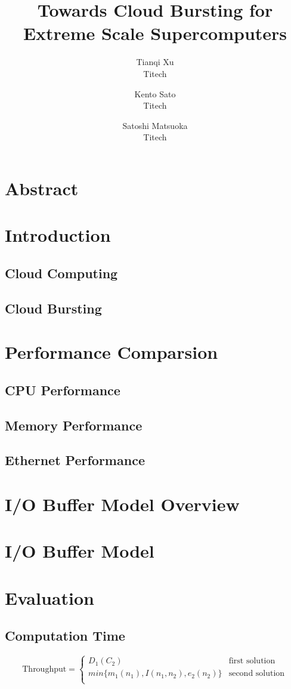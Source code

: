 \documentclass{article}
\begin{document}
\title{Towards Cloud Bursting for Extreme Scale Supercomputers}
\author{Tianqi Xu \\ Titech \and Kento Sato \\Titech \and Satoshi Matsuoka\\Titech}
\date{}
\maketitle
\section*{Abstract}
\section{Introduction}
\subsection{Cloud Computing}
\subsection{Cloud Bursting}
\section{Performance Comparsion}
\subsection{CPU Performance}
\subsection{Memory Performance}
\subsection{Ethernet Performance}
\section{I/O Buffer Model Overview}
\section{I/O Buffer Model}
\section{Evaluation}
\subsection{Computation Time}
\begin{equation*}
\text{Throughput}=
\begin{cases}
D_1(C_2) & \text{first solution}\\
min\{m_1(n_1),I(n_1,n_2),e_2(n_2)\} & \text{second solution}\\
\end{cases}
\end{equation*}
\end{document}
